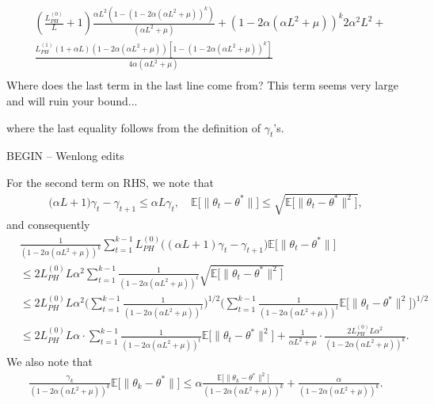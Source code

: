 \documentclass[a4paper]{article}
\newcommand{\norm}[1]{\|#1 \|}
\newcommand{\Exs}{\mathbb{E}}
\newcommand{\thetastar}{\theta^*}
\newcommand{\constLPH}[1]{L_{PH}^{(#1)}}
\newcommand{\mwlcomment}[1]{{\color{orange} #1}}
\newcommand{\stepsize}{\alpha}
\begin{document}
\begin{equation}
\begin{split}
		& \left(\frac{L_{PH}^{(0)}}{L} + 1\right)\frac{\alpha L^{2}\left(1 - \left(1 - 2\alpha\left(\alpha L^{2} + \mu\right)\right)^{k}\right)}{\left(\alpha L^{2} + \mu\right)} + \left(1 - 2\alpha\left(\alpha L^{2} + \mu\right)\right)^{k}2\alpha^{2}L^{2} +\\
		& \frac{L_{PH}^{(1)}\left(1 + \alpha L\right)\left(1 - 2\alpha\left(\alpha L^{2} + \mu\right)\right)\left[1 - \left(1 - 2\alpha\left(\alpha L^{2} + \mu\right)\right)^{k}\right]}{4\alpha\left(\alpha L^{2} + \mu\right)}\\
	\end{split}
\end{equation}
\mwlcomment{Where does the last term in the last line come from? This term seems very large and will ruin your bound...}

where the last equality follows from the definition of $\gamma_{t}$'s.




\mwlcomment{BEGIN -- Wenlong edits}

For the second term on RHS, we note that
\begin{align*}
	\big( \stepsize L + 1 \big) \gamma_{t} - \gamma_{t + 1} \leq \stepsize L \gamma_{t}, \quad \Exs  \big[ \norm{\theta_{t} - \thetastar} \big] \leq \sqrt{ \Exs \big[ \norm{\theta_{t} - \thetastar}^2 \big]},
\end{align*}
and consequently
\begin{align*}
	&\frac{1}{(1 - 2 \stepsize (\stepsize L^2 + \mu))^k} \sum_{t = 1}^{k - 1} \constLPH{0} \big( (\stepsize L + 1) \gamma_{t} - \gamma_{t + 1}\big)\Exs \big[ \norm{\theta_{t} - \thetastar} \big] \\
	&\leq 2 \constLPH{0} L \stepsize^2  \sum_{t = 1}^{k - 1} \frac{1}{(1 - 2 \stepsize (\stepsize L^2 + \mu))^t} \sqrt{\Exs \big[ \norm{\theta_{t} - \thetastar}^2 \big]}\\
	&\leq 2 \constLPH{0} L \stepsize^2  \Big(  \sum_{t = 1}^{k - 1} \frac{1}{(1 - 2 \stepsize (\stepsize L^2 + \mu))^t} \Big)^{1/2} \Big( \sum_{t = 1}^{k - 1} \frac{1}{(1 - 2 \stepsize (\stepsize L^2 + \mu))^t} \Exs \big[ \norm{\theta_{t} - \thetastar}^2 \big] \Big)^{1/2}\\
	&\leq 2 \constLPH{0} L \stepsize \cdot \sum_{t = 1}^{k - 1} \frac{1}{(1 - 2 \stepsize (\stepsize L^2 + \mu))^t} \Exs \big[ \norm{\theta_{t} - \thetastar}^2 \big] + \frac{1}{\alpha L^{2} + \mu} \cdot \frac{2 \constLPH{0} L \stepsize^2}{(1 - 2 \stepsize (\stepsize L^2 + \mu))^k}.
\end{align*}
We also note that
\begin{align*}
	\frac{\gamma_k}{(1 - 2 \stepsize (\stepsize L^2 + \mu))^k} \Exs \big[ \norm{\theta_k - \thetastar} \big] \leq \stepsize \frac{\Exs \big[ \norm{\theta_k - \thetastar}^2 \big]}{(1 - 2 \stepsize (\stepsize L^2 + \mu))^k} + \frac{\stepsize}{(1 - 2 \stepsize (\stepsize L^2 + \mu))^k}.
\end{align*}
\end{document}
